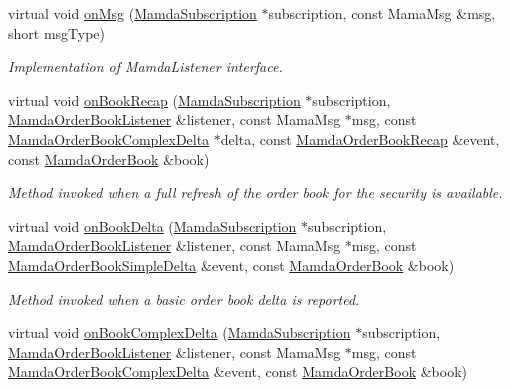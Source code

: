 \begin{CompactItemize}
virtual void \hyperlink{classMamdaOrderBookDepthFilter_0d514d92284c0fefa84201aae411111d}{on\-Msg} (\hyperlink{classWombat_1_1MamdaSubscription}{Mamda\-Subscription} $\ast$subscription, const Mama\-Msg \&msg, short msg\-Type)
\begin{CompactList}\small\item\em Implementation of Mamda\-Listener interface. \item\end{CompactList}\item 
virtual void \hyperlink{classMamdaOrderBookDepthFilter_5d9d813f0c49a0afe232d333a46236c8}{on\-Book\-Recap} (\hyperlink{classWombat_1_1MamdaSubscription}{Mamda\-Subscription} $\ast$subscription, \hyperlink{classWombat_1_1MamdaOrderBookListener}{Mamda\-Order\-Book\-Listener} \&listener, const Mama\-Msg $\ast$msg, const \hyperlink{classWombat_1_1MamdaOrderBookComplexDelta}{Mamda\-Order\-Book\-Complex\-Delta} $\ast$delta, const \hyperlink{classWombat_1_1MamdaOrderBookRecap}{Mamda\-Order\-Book\-Recap} \&event, const \hyperlink{classWombat_1_1MamdaOrderBook}{Mamda\-Order\-Book} \&book)
\begin{CompactList}\small\item\em Method invoked when a full refresh of the order book for the security is available. \item\end{CompactList}\item 
virtual void \hyperlink{classMamdaOrderBookDepthFilter_f4fc478bf1306d3eb5af4f0278bfb198}{on\-Book\-Delta} (\hyperlink{classWombat_1_1MamdaSubscription}{Mamda\-Subscription} $\ast$subscription, \hyperlink{classWombat_1_1MamdaOrderBookListener}{Mamda\-Order\-Book\-Listener} \&listener, const Mama\-Msg $\ast$msg, const \hyperlink{classWombat_1_1MamdaOrderBookSimpleDelta}{Mamda\-Order\-Book\-Simple\-Delta} \&event, const \hyperlink{classWombat_1_1MamdaOrderBook}{Mamda\-Order\-Book} \&book)
\begin{CompactList}\small\item\em Method invoked when a basic order book delta is reported. \item\end{CompactList}\item 
virtual void \hyperlink{classMamdaOrderBookDepthFilter_1816fe7b1f93ae44a94127c8995f7a26}{on\-Book\-Complex\-Delta} (\hyperlink{classWombat_1_1MamdaSubscription}{Mamda\-Subscription} $\ast$subscription, \hyperlink{classWombat_1_1MamdaOrderBookListener}{Mamda\-Order\-Book\-Listener} \&listener, const Mama\-Msg $\ast$msg, const \hyperlink{classWombat_1_1MamdaOrderBookComplexDelta}{Mamda\-Order\-Book\-Complex\-Delta} \&event, const \hyperlink{classWombat_1_1MamdaOrderBook}{Mamda\-Order\-Book} \&book)

\end{CompactItemize}
